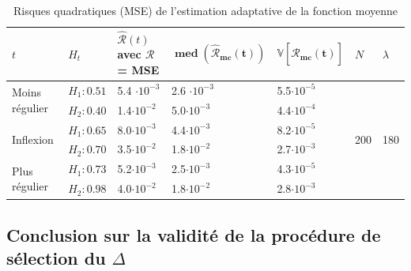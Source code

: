 \begin{table}[H]
	\centering
	\begin{tabularx}{\linewidth}{|X|X|X|X|X|X|X|}
		\toprule
		$t$                                  & $H_t$        & $\widehat{\mathcal R}(t)$ avec $\mathcal R$ = MSE & $\mathbf{\operatorname{med}(\widehat{\mathcal R}_{mc}(t))}$ & $\mathbf{\mathds V[\widehat{\mathcal R}_{mc}(t)]}$ & $N$                       & $\lambda$
		\\
		\midrule
		\multirow{2}{\hsize}{Moins régulier} & $H_1 : 0.51$ & 5.4 $\cdot 10^{-3}$                               & 2.6  $\cdot 10^{-3}$                                        & 5.5$\cdot 10^{-5}$                                 & \multirow{6}{\hsize}{200} & \multirow{6}{\hsize}{180}
		\\
		                                     & $H_2 : 0.40$ & 1.4$\cdot 10^{-2}$                                & 5.0$\cdot 10^{-3}$                                          & 4.4$\cdot 10^{-4}$                                 &                           &
		\\
		\cmidrule{1-5}
		\multirow{2}{\hsize}{Inflexion}      & $H_1 : 0.65$ & 8.0$\cdot 10^{-3}$                                & 4.4$\cdot 10^{-3}$                                          & 8.2$\cdot 10^{-5}$                                 &                           &
		\\
		                                     & $H_2 : 0.70$ & 3.5$\cdot 10^{-2}$                                & 1.8$\cdot 10^{-2}$                                          & 2.7$\cdot 10^{-3}$                                 &                           &
		\\
		\cmidrule{1-5}
		\multirow{2}{\hsize}{Plus régulier}  & $H_1 : 0.73$ & 5.2$\cdot 10^{-3}$                                & 2.5$\cdot 10^{-3}$                                          & 4.3$\cdot 10^{-5}$                                 &                           &
		\\
		                                     & $H_2 : 0.98$ & 4.0$\cdot 10^{-2}$                                & 1.8$\cdot 10^{-2}$                                          & 2.8$\cdot 10^{-3}$                                 &                           &
		\\
		\bottomrule
	\end{tabularx}
	\caption{Risques quadratiques (MSE) de l'estimation adaptative de la fonction moyenne}
\end{table}

\subsection{Conclusion sur la validité de la procédure de sélection du $\Delta$}


